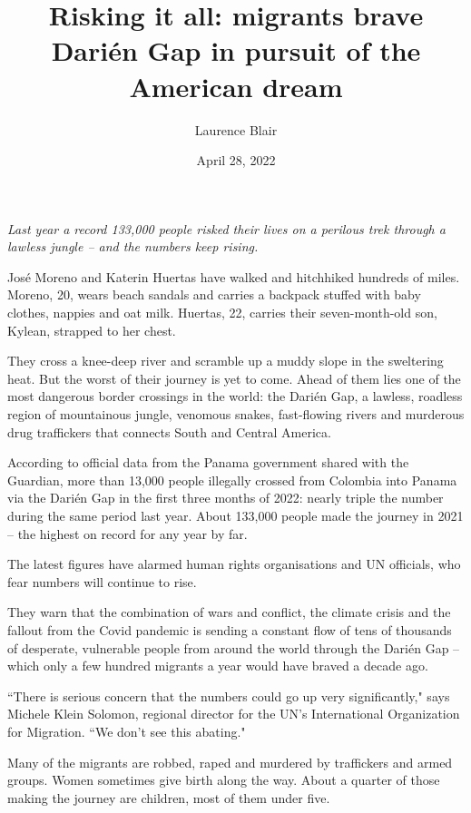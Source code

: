 \documentclass[10pt,a4paper]{article}
\newcommand{\qm}[1]{``#1"}
\begin{document}
\title{Risking it all: migrants brave Darién Gap in pursuit of the American dream}
\date{April 28, 2022}
\author{Laurence Blair}

\maketitle

\noindent\textit{Last year a record 133,000 people risked their lives on a perilous trek through a lawless jungle -- and the numbers keep rising.}

\bigskip

\noindent\linenumbers José Moreno and Katerin Huertas have walked and hitchhiked hundreds of miles. Moreno, 20, wears beach sandals and carries a backpack stuffed with baby clothes, nappies and oat milk. Huertas, 22, carries their seven-month-old son, Kylean, strapped to her chest.

They cross a knee-deep river and scramble up a muddy slope in the sweltering heat. But the worst of their journey is yet to come. Ahead of them lies one of the most dangerous border crossings in the world: the Darién Gap, a lawless, roadless region of mountainous jungle, venomous snakes, fast-flowing rivers and murderous drug traffickers that connects South and Central America.

According to official data from the Panama government shared with the Guardian, more than 13,000 people illegally crossed from Colombia into Panama via the Darién Gap in the first three months of 2022: nearly triple the number during the same period last year. About 133,000 people made the journey in 2021 -- the highest on record for any year by far.

The latest figures have alarmed human rights organisations and UN officials, who fear numbers will continue to rise.

They warn that the combination of wars and conflict, the climate crisis and the fallout from the Covid pandemic is sending a constant flow of tens of thousands of desperate, vulnerable people from around the world through the Darién Gap -- which only a few hundred migrants a year would have braved a decade ago.

\qm{There is serious concern that the numbers could go up very significantly,} says Michele Klein Solomon, regional director for the UN's International Organization for Migration. \qm{We don't see this abating.}

Many of the migrants are robbed, raped and murdered by traffickers and armed groups. Women sometimes give birth along the way. About a quarter of those making the journey are children, most of them under five.
\end{document}
